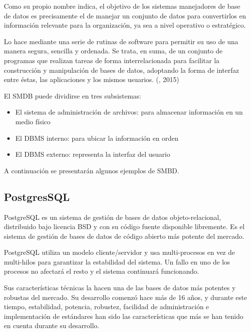 Como su propio nombre indica, el objetivo de los sistemas manejadores de base de datos es precisamente el de manejar un conjunto de datos para convertirlos en información relevante para la organización, ya sea a nivel operativo o estratégico.
 
Lo hace mediante una serie de rutinas de software para permitir su uso de una manera segura, sencilla y ordenada. Se trata, en suma, de un conjunto de programas que realizan tareas de forma interrelacionada para facilitar la construcción y manipulación de bases de datos, adoptando la forma de interfaz entre éstas, las aplicaciones y los mismos usuarios. (\citet{smdbbib}, 2015)

El SMDB puede dividirse en tres subsistemas:
\setlength{\parskip}{0mm}
\begin{itemize}

    \item El sistema de administración de archivos: para almacenar información en un medio físico
    
    \item El DBMS interno: para ubicar la información en orden
    
    \item El DBMS externo: representa la interfaz del usuario

\end{itemize}



\setlength{\parskip}{5mm}
A continuación se presentarán algunos ejemplos de SMBD.
\setlength{\parskip}{0mm}

\subsection {PostgresSQL}
\setlength{\parskip}{5mm}
PostgreSQL es un sistema de gestión de bases de datos objeto-relacional, distribuido bajo licencia BSD y con su código fuente disponible libremente. Es el sistema de gestión de bases de datos de código abierto más potente del mercado.

PostgreSQL utiliza un modelo cliente/servidor y usa multi-procesos en vez de multi-hilos para garantizar la estabilidad del sistema. Un fallo en uno de los procesos no afectará el resto y el sistema continuará funcionando.

Sus características técnicas la hacen una de las bases de datos más potentes y robustas del mercado. Su desarrollo comenzó hace más de 16 años, y durante este tiempo, estabilidad, potencia, robustez, facilidad de administración e implementación de estándares han sido las características que más se han tenido en cuenta durante su desarrollo.

